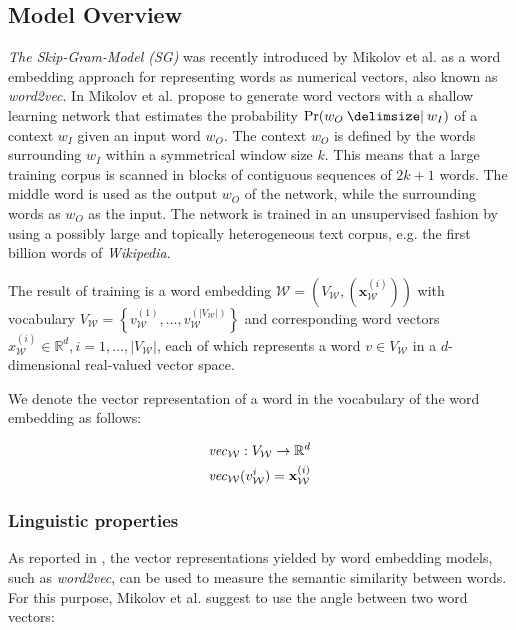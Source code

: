 \subsection{Model Overview}
\emph{The Skip-Gram-Model (SG)} was recently introduced by Mikolov et al. as a word embedding
approach for representing words as numerical vectors, also known as \emph{word2vec}. 
In \cite{mikolov2013distributed} Mikolov et al. propose to generate word vectors with 
a shallow learning network that estimates the probability $\Pr(w_O\given w_I)$ of a context
$w_I$ given an input word $w_O$. The context $w_O$ is defined by the words
surrounding $w_I$ within a symmetrical window size $k$. This means that a 
large training corpus is scanned in blocks of contiguous sequences of $2k + 1$ words. 
The middle word is used as the output $w_O$  of the network, while the surrounding words as $w_O$ as the input. 
The network is trained in an unsupervised fashion by using a possibly large and topically heterogeneous text
corpus, e.g. the first billion words of \emph{Wikipedia}.

The result of training is a word embedding $\mathcal{W}=\left(V_{\mathcal{W}}, (\mathbf{x}_\mathcal{W}^{(i)})\right)$ 
with vocabulary $V_{\mathcal{W}} = \left\{ v_{\mathcal{W}}^{(1)}, \ldots,
v_\mathcal{W}^{(|V_\mathcal{W}|)} \right\} $ and corresponding word vectors
$x_\mathcal{W}^{(i)} \in \mathbb{R}^d, i=1,\ldots, |V_{\mathcal{W}}|$, each of
which represents a word $v \in V_\mathcal{W}$ in a $d$-dimensional real-valued vector space. 

We denote the vector representation of a word in the vocabulary of the word
embedding as follows:

\begin{equation*}
\begin{split}
\mathit{vec}_{\mathcal{W}}: V_\mathcal{W} \to \mathbb{R}^d \\
\mathit{vec}_{\mathcal{W}}(v^i_{\mathcal{W}}) = \mathbf{x}_{\mathcal{W}}^{(i)}
\end{split}
\end{equation*}

\subsubsection{Linguistic properties}
As reported in \cite{mikolov2013distributed}, the vector representations yielded by word embedding models, such as \emph{word2vec},
can be used to measure the semantic similarity between words. For this purpose, Mikolov et al. 
suggest to use the angle between two word vectors:

